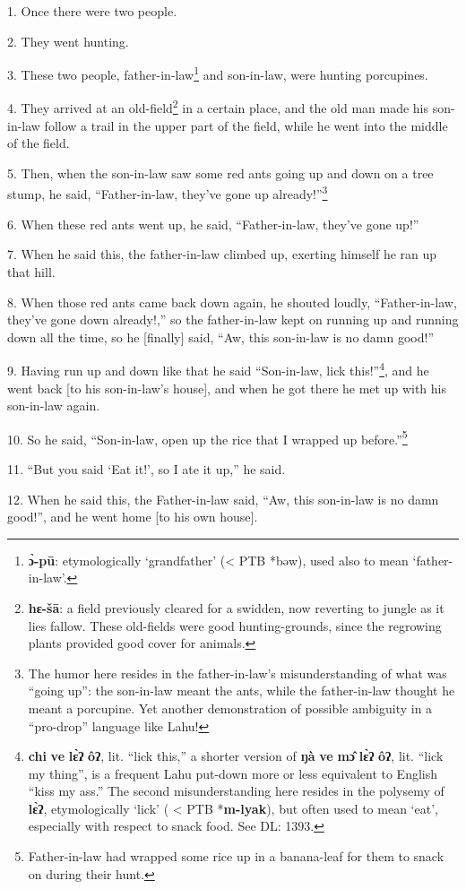 \setcounter{footnote}{0}

1. Once there were two people.

2. They went hunting.

3. These two people, father-in-law\footnote{\textbf{ɔ̀-pū}: etymologically `grandfather' (< PTB *bəw), used also to mean `father-in-law'.} and son-in-law, were hunting porcupines.

4. They arrived at an old-field\footnote{\textbf{hɛ-šā}: a field previously cleared for a swidden, now reverting to jungle as it lies fallow. These old-fields were good hunting-grounds, since the regrowing plants provided good cover for animals.} in a certain place, and the old man made his
son-in-law follow a trail in the upper part of the field, while he went into the
middle of the field.

5. Then, when the son-in-law saw some red ants going up and down on a tree stump,
he said, ``Father-in-law, they've gone up already!''\footnote{The humor here resides in the father-in-law's misunderstanding of what was ``going up'': the son-in-law meant the ants, while the father-in-law thought he meant a porcupine. Yet another demonstration of possible ambiguity in a ``pro-drop'' language like Lahu!}

6. When these red ants went up, he said, ``Father-in-law, they've gone up!''

7. When he said this, the father-in-law climbed up, exerting himself he ran up
that hill.

8. When those red ants came back down again, he shouted loudly, ``Father-in-law,
they've gone down already!,'' so the father-in-law kept on running up and running
down all the time, so he [finally] said, ``Aw, this son-in-law is no damn good!''

9. Having run up and down like that he said ``Son-in-law, lick this!''\footnote{\textbf{chi} \textbf{ve} \textbf{lɛ̀ʔ} \textbf{ôʔ}, lit. ``lick this,'' a shorter version of \textbf{ŋà} \textbf{ve} \textbf{mɔ̂} \textbf{lɛ̀ʔ} \textbf{ôʔ}, lit. ``lick my thing'', is a frequent Lahu put-down more or less equivalent to English ``kiss my ass.'' The second misunderstanding here resides in the polysemy of \textbf{lɛ̀ʔ}, etymologically `lick' ( < PTB *\textbf{m-lyak}), but often used to mean `eat', especially with respect to snack food. See DL: 1393.}, and
he went back [to his son-in-law's house], and when he got there he met up with
his son-in-law again.

10. So he said, ``Son-in-law, open up the rice that I wrapped up before.''\footnote{Father-in-law had wrapped some rice up in a banana-leaf for them to snack on during their hunt.}

11. ``But you said `Eat it!', so I ate it up,'' he said.

12. When he said this, the Father-in-law said, ``Aw, this son-in-law is no damn
good!'', and he went home [to his own house].

